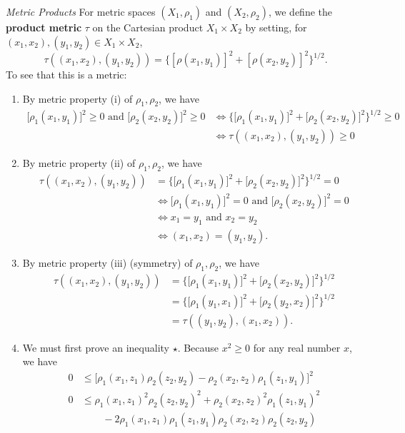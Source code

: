 \begin{flushleft}
\textit{Metric Products}
For metric spaces $(X_1,\rho_1)$ and $(X_2,\rho_2)$, we define the \textbf{product metric} $\tau$ on the Cartesian product $X_1 \times X_2$ by setting, for $(x_1,x_2),(y_1,y_2)\in X_1 \times X_2$,
\[
    \tau((x_1,x_2),(y_1,y_2))= \{[\rho(x_1,y_1)]^2+[\rho(x_2,y_2)]^2\}^{1/2}.
\]
To see that this is a metric:
\begin{enumerate}[label=(\roman*),align=right]
    \item By metric property (i) of $\rho_1,\rho_2$, we have
    \begin{align*}
        \lbrack\rho_1(x_1,y_1)\rbrack^2\ge0\text{ and }\lbrack\rho_2(x_2,y_2)\rbrack^2\ge0
        &\iff \{\lbrack\rho_1(x_1,y_1)\rbrack^2+\lbrack\rho_2(x_2,y_2)\rbrack^2\}^{1/2}\ge0\\
        &\iff \tau((x_1,x_2),(y_1,y_2))\ge0
    \end{align*}
    \item By metric property (ii) of $\rho_1,\rho_2$, we have
    \begin{align*} 
        \tau((x_1,x_2),(y_1,y_2))&=\{\lbrack\rho_1 (x_1,y_1)\rbrack^2+\lbrack\rho_2 (x_2,y_2)\rbrack^2\}^{1/2}=0\\
        &\iff \lbrack\rho_1 (x_1,y_1)\rbrack^2=0\text{ and }\lbrack\rho_2 (x_2,y_2)\rbrack^2=0\\
        &\iff x_1=y_1\text{ and }x_2=y_2\\
        &\iff (x_1,x_2)=(y_1,y_2).
    \end{align*}
    \item By metric property (iii) (symmetry) of $\rho_1,\rho_2$, we have
    \begin{align*}
        \tau((x_1,x_2),(y_1,y_2)) &=\{\lbrack\rho_1 (x_1,y_1)\rbrack^2+\lbrack\rho_2 (x_2,y_2)\rbrack^2\}^{1/2}\\
        &=\{\lbrack\rho_1 (y_1,x_1)\rbrack^2+\lbrack\rho_2 (y_2,x_2)\rbrack^2\}^{1/2}\\
        &= \tau((y_1,y_2),(x_1,x_2)).
    \end{align*}
    \item We must first prove an inequality $\star$. Because $x^2\ge0$ for any real number $x$, we have
    \begin{align*}
        0&\le\lbrack\rho_1(x_1,z_1)\rho_2(z_2,y_2)-\rho_2(x_2,z_2)\rho_1(z_1,y_1)\rbrack^2\\
        0&\le\rho_1(x_1,z_1)^2\rho_2(z_2,y_2)^2+\rho_2(x_2,z_2)^2\rho_1(z_1,y_1)^2\\&\phantom{\le+{}}-2\rho_1(x_1,z_1)\rho_1(z_1,y_1)\rho_2(x_2,z_2)\rho_2(z_2,y_2)\\

\end{align*}
\end{enumerate}
\end{flushleft}
